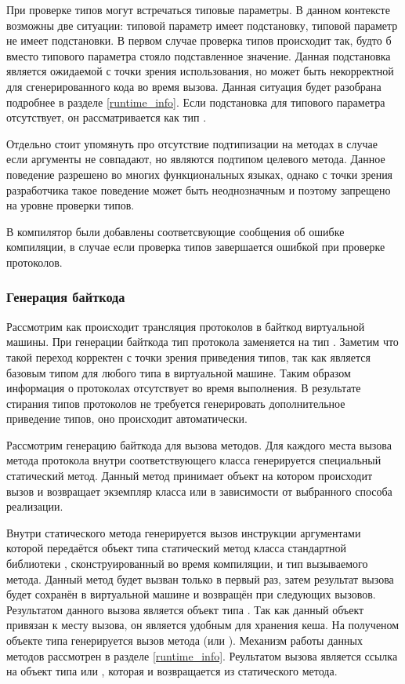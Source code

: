 При проверке типов могут встречаться типовые параметры. В данном контексте возможны две ситуации: типовой параметр имеет подстановку, типовой параметр не имеет подстановки. В первом случае проверка типов происходит так, будто б вместо типового параметра стояло подставленное значение. Данная подстановка является ожидаемой с точки зрения использования, но может быть некорректной для сгенерированного кода во время вызова. Данная ситуация будет разобрана подробнее в разделе \ref{runtime_info}. Если подстановка для типового параметра отсутствует, он рассматривается как тип .

Отдельно стоит упомянуть про отсутствие подтипизации на методах в случае если аргументы не совпадают, но являются подтипом целевого метода. Данное поведение разрешено во многих функциональных языках, однако с точки зрения разработчика такое поведение может быть неоднозначным и поэтому запрещено на уровне проверки типов.

В компилятор были добавлены соответсвующие сообщения об ошибке компиляции, в случае если проверка типов завершается ошибкой при проверке протоколов.

\subsubsection{Генерация байткода}
Рассмотрим как происходит трансляция протоколов в байткод виртуальной машины. При генерации байткода тип протокола заменяется на тип . Заметим что такой переход корректен с точки зрения приведения типов, так как  является базовым типом для любого типа в виртуальной машине. Таким образом информация о протоколах отсутствует во время выполнения. В результате стирания типов протоколов не требуется генерировать дополнительное приведение типов, оно происходит автоматически.

Рассмотрим генерацию байткода для вызова методов. Для каждого места вызова метода протокола внутри соответствующего класса генерируется специальный статический метод. Данный метод принимает объект на котором происходит вызов и возвращает экземпляр класса  или  в зависимости от выбранного способа реализации.

Внутри статического метода генерируется вызов инструкции  аргументами которой передаётся объект типа  статический метод  класса стандартной библиотеки , сконструированный во время компиляции, и тип вызываемого метода. Данный метод будет вызван только в первый раз, затем результат вызова будет сохранён в виртуальной машине и возвращён при следующих вызовов. Результатом данного вызова является объект типа . Так как данный объект привязан к месту вызова, он является удобным для хранения кеша. На полученом объекте типа  генерируется вызов метода (или ). Механизм работы данных методов рассмотрен в разделе \ref{runtime_info}. Реультатом вызова является ссылка на объект типа  или , которая и возвращается из статического метода.

